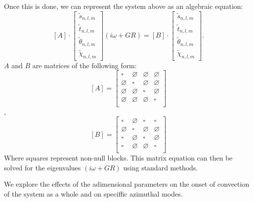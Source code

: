 \documentclass[a4paper,10pt]{book}
\begin{document}
Once this is done, we can represent the system above as an algebraic equation:
\begin{equation}
 \left[ A \right] \cdot
 \begin{bmatrix}
    \tilde s_{n,l,m}\\
    \tilde t_{n,l,m}\\
    \tilde \theta_{n,l,m}\\
    \tilde \chi_{n,l,m}
\end{bmatrix}
(i\omega +GR)  =
 \left[ B \right]
        \cdot
        \begin{bmatrix}
        \tilde s_{n,l,m}\\
        \tilde t_{n,l,m}\\
        \tilde \theta_{n,l,m}\\
        \tilde \chi_{n,l,m}
        \end{bmatrix}.
\end{equation}
$A$ and $B$ are matrices of the following form:
\begin{equation}
\left[ A \right] =
\begin{bmatrix}
\square     & \varnothing & \varnothing & \varnothing \\
\varnothing & \square     & \varnothing & \varnothing \\
\varnothing & \varnothing & \square     & \varnothing \\
\varnothing & \varnothing & \varnothing & \square \\
\end{bmatrix}
\end{equation},
\begin{equation}
\left[ B \right] =
\begin{bmatrix}
\square     & \varnothing & \square     & \square     \\
\varnothing & \square     & \varnothing & \varnothing \\
\square     & \varnothing & \square     & \varnothing \\
\square     & \varnothing & \varnothing & \square     \\
\end{bmatrix}
\end{equation}
Where squares represent non-null blocks.
This matrix equation can then be solved for the eigenvalues $(i\omega +GR)$
using standard methods.

We explore the effects of the adimensional parameters on the onset of convection
of the system as a whole and on speciffic azimuthal modes.
\end{document}
